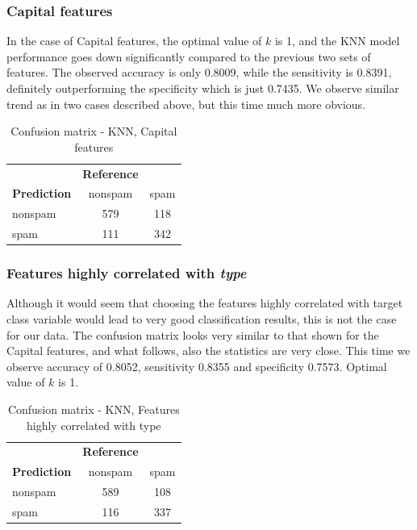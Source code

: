 \documentclass{article}\usepackage[]{graphicx}\usepackage[]{xcolor}
\begin{document}
\subsubsection*{Capital features}

In the case of Capital features, the optimal value of $k$ is 1, and the KNN model performance goes down significantly
compared to the previous two sets of features. The observed accuracy is only 0.8009,
while the sensitivity is 0.8391, definitely outperforming the specificity
which is just 0.7435. We observe similar trend as in two cases described above, but 
this time much more obvious.

\begin{table}[h]
    \centering
    \begin{tabular}{lcc}
        & \textbf{Reference} & \\
        \textbf{Prediction} & nonspam & spam \\
        nonspam & 579 & 118 \\
        spam & 111 & 342 \\
    \end{tabular}
    \caption{Confusion matrix - KNN, Capital features}
    \label{KNNcm3}
\end{table}

\subsubsection*{Features highly correlated with \textit{type}}

Although it would seem that choosing the features highly correlated with target class variable
would lead to very good classification results, this is not the case for our data.
The confusion matrix looks very similar to that shown for the Capital features, 
and what follows, also the statistics are very close. This time we observe accuracy of
0.8052, sensitivity 0.8355 and specificity 0.7573. Optimal value of $k$ is 1.

\begin{table}[h]
    \centering
    \begin{tabular}{lcc}
        & \textbf{Reference} & \\
        \textbf{Prediction} & nonspam & spam \\
        nonspam & 589 & 108 \\
        spam & 116 & 337 \\
    \end{tabular}
    \caption{Confusion matrix - KNN, Features highly correlated with type}
    \label{KNNcm4}
\end{table}
\end{document}
